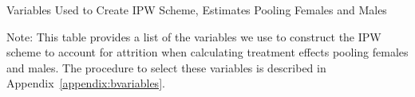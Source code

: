 \begin{sidewaystable}[H]
\begin{threeparttable}
\caption{Variables Used to Create IPW Scheme, Estimates Pooling Females and Males}
\label{table:attpooled}
\centering

\begin{tablenotes}
\footnotesize
\item Note: This table provides a list of the variables we use to construct the IPW scheme to account for attrition when calculating treatment effects pooling females and males. The procedure to select these variables is described in Appendix~\ref{appendix:bvariables}.
\end{tablenotes}
\end{threeparttable}
\end{sidewaystable}

\restoregeometry
\doublespacing 